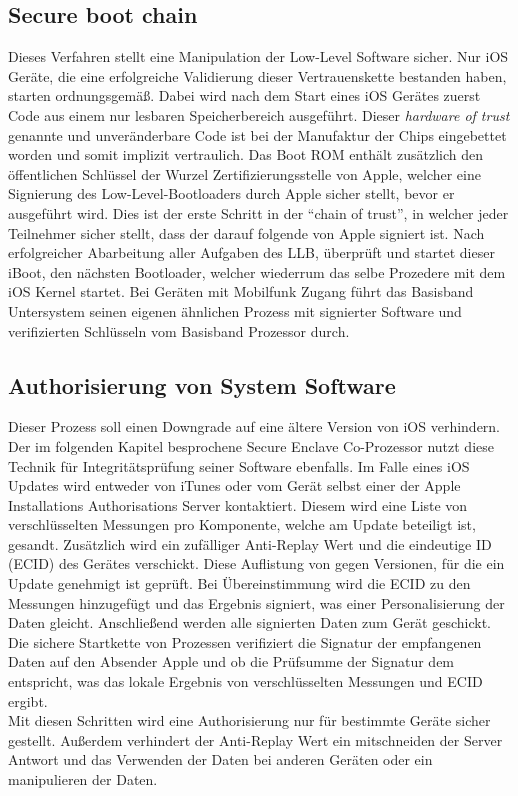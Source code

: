 	\subsection{Secure boot chain}\label{sec:secure-boot-chain}
		Dieses Verfahren stellt eine Manipulation der Low-Level Software sicher. Nur
		iOS Geräte, die eine erfolgreiche Validierung dieser Vertrauenskette bestanden
		haben, starten ordnungsgemäß. Dabei wird nach dem Start eines iOS Gerätes
		zuerst Code aus einem nur lesbaren Speicherbereich ausgeführt. Dieser
		\textit{hardware of trust} genannte und unveränderbare Code ist bei der 
		Manufaktur der Chips eingebettet worden und somit implizit vertraulich. Das
		Boot ROM enthält zusätzlich den öffentlichen Schlüssel der Wurzel
		Zertifizierungsstelle von Apple, welcher eine Signierung des
		Low-Level-Bootloaders durch Apple sicher stellt, bevor er ausgeführt wird. 
		Dies ist der erste Schritt in der "`chain of trust"', in welcher jeder
		Teilnehmer sicher stellt, dass der darauf folgende von Apple signiert ist. 		
		Nach erfolgreicher Abarbeitung aller Aufgaben des LLB, überprüft und startet
		dieser iBoot, den nächsten Bootloader, welcher wiederrum das selbe Prozedere
		mit dem iOS Kernel startet. Bei Geräten mit Mobilfunk Zugang führt das
		Basisband Untersystem seinen eigenen ähnlichen Prozess mit signierter 
		Software und verifizierten Schlüsseln vom Basisband Prozessor durch.
		
	\subsection{Authorisierung von System Software}\label{sec:code-signing}
		Dieser Prozess soll einen Downgrade auf eine ältere Version von iOS
		verhindern. Der im folgenden Kapitel besprochene Secure Enclave Co-Prozessor
		nutzt diese Technik für Integritätsprüfung seiner Software ebenfalls. Im Falle
		eines iOS Updates wird entweder von iTunes oder vom Gerät selbst einer der
		Apple Installations Authorisations Server kontaktiert. Diesem wird eine Liste
		von verschlüsselten Messungen pro Komponente, welche am Update
		beteiligt ist, gesandt. Zusätzlich wird ein	zufälliger Anti-Replay Wert und
		die eindeutige ID (ECID) des Gerätes verschickt. Diese Auflistung von gegen
		Versionen, für die ein Update genehmigt ist geprüft. Bei Übereinstimmung wird
		die ECID zu den Messungen hinzugefügt und das Ergebnis signiert, was einer
		Personalisierung der Daten gleicht.	Anschließend werden alle signierten Daten
		zum Gerät geschickt. Die sichere Startkette von Prozessen verifiziert die
		Signatur der empfangenen Daten auf den Absender Apple und ob die Prüfsumme der
		Signatur dem entspricht, was das lokale Ergebnis von verschlüsselten Messungen
		und ECID ergibt.\\
		Mit diesen Schritten wird eine Authorisierung nur für bestimmte Geräte sicher
		gestellt. Außerdem verhindert der Anti-Replay Wert ein mitschneiden der Server
		Antwort und das Verwenden der Daten bei anderen Geräten oder ein manipulieren
		der Daten.
